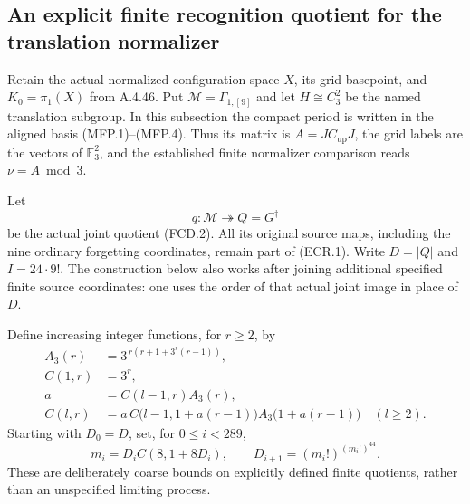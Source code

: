 \subsection{An explicit finite recognition quotient for the translation normalizer}

Retain the actual normalized configuration space $X$, its grid basepoint,
and $K_0=\pi_1(X)$ from A.4.46.  Put
$\mathcal M=\Gamma_{1,[9]}$ and let $H\cong C_3^2$ be the named
translation subgroup.  In this subsection the compact period is written
in the aligned basis (MFP.1)--(MFP.4).  Thus its matrix is
$A=JC_{\mathrm{up}}J$, the grid labels are the vectors of
$\mathbb F_3^2$, and the established finite normalizer comparison reads
$\nu=A\bmod3$.

Let
\[
 q:\mathcal M\twoheadrightarrow Q=G^\dagger
                                                               \tag{ECR.1}
\]
be the actual joint quotient (FCD.2).  All its original source maps,
including the nine ordinary forgetting coordinates, remain part of
(ECR.1).  Write $D=|Q|$ and $I=24\cdot9!$.  The construction below also
works after joining additional specified finite source coordinates:
one uses the order of that actual joint image in place of $D$.

Define increasing integer functions, for $r\geq2$, by
\[
 \begin{split}
 A_3(r)&=3^{\,r(r+1+3^r(r-1))},\\
 C(1,r)&=3^r,\\
 a&=C(l-1,r)A_3(r),\\
 C(l,r)&=a\,C\bigl(l-1,1+a(r-1)\bigr)
                    A_3\bigl(1+a(r-1)\bigr)\quad(l\geq2).
 \end{split}                                                    \tag{ECR.2}
\]
Starting with $D_0=D$, set, for $0\leq i<289$,
\[
 m_i=D_iC(8,1+8D_i),\qquad
 D_{i+1}=(m_i!)^{(m_i!)^{44}}.
                                                               \tag{ECR.3}
\]
These are deliberately coarse bounds on explicitly defined finite
quotients, rather than an unspecified limiting process.

